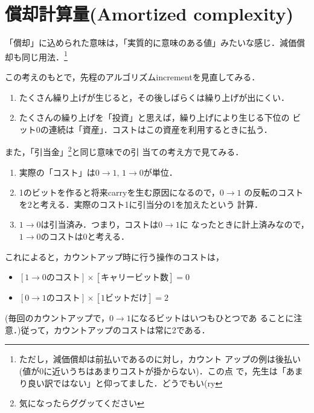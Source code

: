 \section{償却計算量(Amortized complexity)} \label{sec:償却計算量}
「償却」に込められた意味は，「実質的に意味のある値」みたいな感じ．減価償
却も同じ用法．\footnote{ただし，減価償却は前払いであるのに対し，カウント
アップの例は後払い(値が0に近いうちはあまりコストが掛からない)．この点
で，先生は「あまり良い訳ではない」と仰ってました．どうでもい(ry}

この考えのもとで，先程のアルゴリズムincrementを見直してみる．

\begin{enumerate}
 \item たくさん繰り上げが生じると，その後しばらくは繰り上げが出にくい．
 \item たくさんの繰り上げを「投資」と思えば，繰り上げにより生じる下位の
       ビット0の連続は「資産」．コストはこの資産を利用するときに払う．
\end{enumerate}

また，「引当金」\footnote{気になったらググッてください}と同じ意味での引
当ての考え方で見てみる．

\begin{enumerate}
 \item 実際の「コスト」は$0 \rightarrow 1, \, 1 \rightarrow 0$が単位．
 \item 1のビットを作ると将来carryを生む原因になるので，$0 \rightarrow 1$
       の反転のコストを2と考える．実際のコスト1に引当分の1を加えたという
       計算．
 \item $1 \rightarrow 0$は引当済み．つまり，コストは$0 \rightarrow 1$に
       なったときに計上済みなので，$1 \rightarrow 0$のコストは0と考える．
\end{enumerate}

これによると，カウントアップ時に行う操作のコストは，
\begin{itemize}
 \item $[1 \rightarrow 0 のコスト] \times [キャリービット数] = 0$
 \item $[0 \rightarrow 1 のコスト] \times [1ビットだけ] = 2$ 
\end{itemize}
(毎回のカウントアップで，$0 \rightarrow 1$になるビットはいつもひとつであ
ることに注意．)従って，カウントアップのコストは常に2である．


